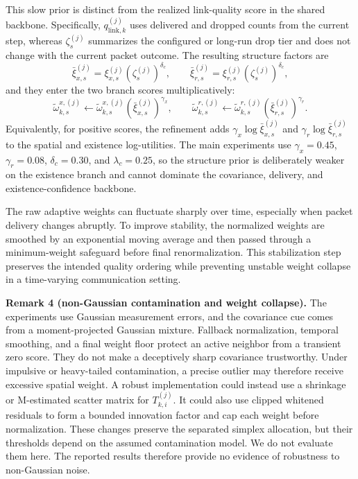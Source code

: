 This slow prior is distinct from the realized link-quality score in the shared backbone. Specifically, $q_{\mathrm{link},k}^{(j)}$ uses delivered and dropped counts from the current step, whereas $\zeta_s^{(j)}$ summarizes the configured or long-run drop tier and does not change with the current packet outcome.
The resulting structure factors are
\begin{equation}
\label{eq:method-structure-combined-prior}
\bar{\xi}_{x,s}^{(j)}
=
\xi_{x,s}^{(j)}\left(\zeta_s^{(j)}\right)^{\delta_c},
\qquad
\bar{\xi}_{r,s}^{(j)}
=
\xi_{r,s}^{(j)}\left(\zeta_s^{(j)}\right)^{\delta_c},
\end{equation}
and they enter the two branch scores multiplicatively:
\begin{equation}
\label{eq:method-structure-modulation}
\tilde{\omega}_{k,s}^{x,(j)}
\leftarrow
\tilde{\omega}_{k,s}^{x,(j)}
\left(\bar{\xi}_{x,s}^{(j)}\right)^{\gamma_x},
\qquad
\tilde{\omega}_{k,s}^{r,(j)}
\leftarrow
\tilde{\omega}_{k,s}^{r,(j)}
\left(\bar{\xi}_{r,s}^{(j)}\right)^{\gamma_r}.
\end{equation}
Equivalently, for positive scores, the refinement adds $\gamma_x\log\bar{\xi}_{x,s}^{(j)}$ and $\gamma_r\log\bar{\xi}_{r,s}^{(j)}$ to the spatial and existence log-utilities. The main experiments use $\gamma_x=0.45$, $\gamma_r=0.08$, $\delta_c=0.30$, and $\lambda_c=0.25$, so the structure prior is deliberately weaker on the existence branch and cannot dominate the covariance, delivery, and existence-confidence backbone.

The raw adaptive weights can fluctuate sharply over time, especially when packet delivery changes abruptly. To improve stability, the normalized weights are smoothed by an exponential moving average and then passed through a minimum-weight safeguard before final renormalization. This stabilization step preserves the intended quality ordering while preventing unstable weight collapse in a time-varying communication setting.

\noindent\textbf{Remark 4 (non-Gaussian contamination and weight collapse).}
The experiments use Gaussian measurement errors, and the covariance cue comes from a moment-projected Gaussian mixture. Fallback normalization, temporal smoothing, and a final weight floor protect an active neighbor from a transient zero score. They do not make a deceptively sharp covariance trustworthy. Under impulsive or heavy-tailed contamination, a precise outlier may therefore receive excessive spatial weight. A robust implementation could instead use a shrinkage or M-estimated scatter matrix for $T_{k,i}^{(j)}$. It could also use clipped whitened residuals to form a bounded innovation factor and cap each weight before normalization. These changes preserve the separated simplex allocation, but their thresholds depend on the assumed contamination model. We do not evaluate them here. The reported results therefore provide no evidence of robustness to non-Gaussian noise.

